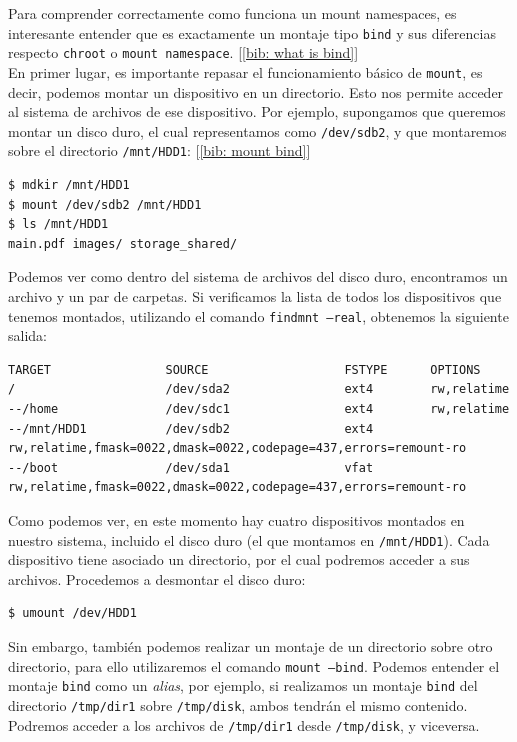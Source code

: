 \documentclass[a4paper, oneside, 12pt]{book}
\begin{document}
	\noindent Para comprender correctamente como funciona un mount namespaces, es interesante entender que es exactamente un montaje tipo \texttt{bind} y sus diferencias respecto \texttt{chroot} o \texttt{mount namespace}. [\ref{bib: what is bind}] \\
	
	\noindent En primer lugar, es importante repasar el funcionamiento básico de \texttt{mount}, es decir, podemos montar un dispositivo en un directorio. Esto nos permite acceder al sistema de archivos de ese dispositivo. Por ejemplo, supongamos que queremos montar un disco duro, el cual representamos como \texttt{/dev/sdb2}, y que montaremos sobre el directorio \texttt{/mnt/HDD1}: [\ref{bib: mount bind}]
	
	\begin{verbatim}
$ mdkir /mnt/HDD1
$ mount /dev/sdb2 /mnt/HDD1
$ ls /mnt/HDD1
main.pdf images/ storage_shared/ 
	\end{verbatim}

	\noindent Podemos ver como dentro del sistema de archivos del disco duro, encontramos un archivo y un par de carpetas. Si verificamos la lista de todos los dispositivos que tenemos montados, utilizando el comando \texttt{findmnt --real}, obtenemos la siguiente salida:
	
	\begin{verbatim}
TARGET                SOURCE                   FSTYPE      OPTIONS
/                     /dev/sda2                ext4        rw,relatime
--/home               /dev/sdc1                ext4        rw,relatime
--/mnt/HDD1           /dev/sdb2                ext4
rw,relatime,fmask=0022,dmask=0022,codepage=437,errors=remount-ro
--/boot               /dev/sda1                vfat
rw,relatime,fmask=0022,dmask=0022,codepage=437,errors=remount-ro
	\end{verbatim}
	
	\noindent Como podemos ver, en este momento hay cuatro dispositivos montados en nuestro sistema, incluido el disco duro (el que montamos en \texttt{/mnt/HDD1}). Cada dispositivo tiene asociado un directorio, por el cual podremos acceder a sus archivos. Procedemos a desmontar el disco duro:
	
	\begin{verbatim}
$ umount /dev/HDD1
	\end{verbatim}
	
	\noindent Sin embargo, también podemos realizar un montaje de un directorio sobre otro directorio, para ello utilizaremos el comando \texttt{mount --bind}. Podemos entender el montaje \texttt{bind} como un \textit{alias}, por ejemplo, si realizamos un montaje \texttt{bind} del directorio \texttt{/tmp/dir1} sobre \texttt{/tmp/disk}, ambos tendrán el mismo contenido. Podremos acceder a los archivos de \texttt{/tmp/dir1} desde \texttt{/tmp/disk}, y viceversa. \\
	
\end{document}
